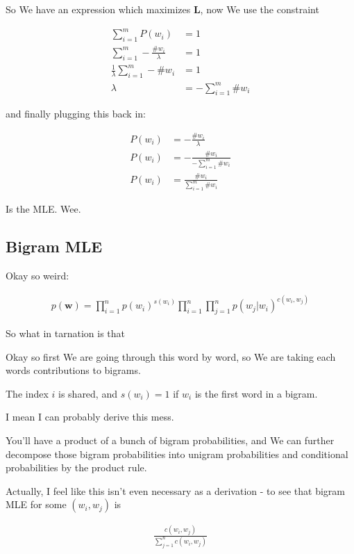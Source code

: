 \documentclass{article}
\begin{document}
		So We have an expression which maximizes $\mathbf{L}$, now We use the constraint 
		
		\begin{align}
			\sum^m_{i=1} P(w_i) &= 1\\
			\sum^m_{i=1} -\frac{\#w_i}{\lambda}  &= 1\\
			\frac{1}{\lambda}\sum^m_{i=1} -\#w_i  &= 1\\
			\lambda &= -\sum^m_{i=1} \#w_i
		\end{align}
		
		and finally plugging this back in:
		
		\begin{align}
			P(w_i)&= -\frac{\#w_i}{\lambda} \\
			P(w_i)&= -\frac{\#w_i}{-\sum^m_{i=1} \#w_i}\\
			P(w_i)&= \frac{\#w_i}{\sum^m_{i=1} \#w_i}
		\end{align}
		
		Is the MLE. Wee.
		
	\subsection{Bigram MLE}
	
		Okay so weird:
		
		\begin{align}
			p(\mathbf{w}) = \prod^n_{i=1} p(w_i)^{s(w_i)}\prod^n_{i=1}\prod^n_{j=1} p(w_j|w_i)^{c(w_i, w_j)}
		\end{align}
		
		So what in tarnation is that
		
		Okay so first We are going through this word by word, so We are taking each words contributions to bigrams. 
		
		The index $i$ is shared, and $s(w_i) = 1$ if $w_i$ is the first word in a bigram.
		
		I mean I can probably derive this mess. 
		
		You'll have a product of a bunch of bigram probabilities, and We can further decompose those bigram probabilities into unigram probabilities and conditional probabilities by the product rule.
		
		Actually, I feel like this isn't even necessary as a derivation - to see that bigram MLE for some $(w_i, w_j)$ is
		
		\begin{align}
			\frac{c(w_i, w_j)}{\sum_{j=1}^n c(w_i, w_j)}
		\end{align}
		
\end{document}
